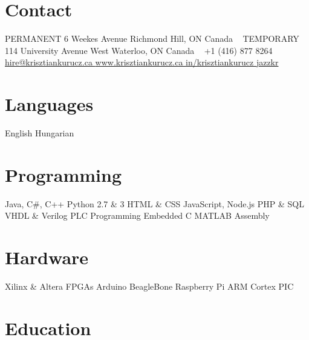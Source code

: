 \documentclass[hidelinks]{kkurucz-cv}
\begin{document}


\begin{aside} %
\section{Contact}
{\headingfont PERMANENT}
6 Weekes Avenue
Richmond Hill, ON
Canada
~
{\headingfont TEMPORARY}
114 University Avenue West
Waterloo, ON
Canada
~
{+1 (416) 877 8264\hspace{1.5mm}\mobile}
~
\href{mailto:hire@krisztiankurucz.ca}{hire@krisztiankurucz.ca }\mail
\href{http://www.krisztiankurucz.ca}{www.krisztiankurucz.ca }\website
\href{http://ca.linkedin.com/in/krisztiankurucz}{in/krisztiankurucz }\linkedin
\href{http://www.github.com/jazzkr}{jazzkr }\github
\section{Languages}
English
Hungarian
\section{Programming}
Java, C\#, C++
Python 2.7 \& 3
HTML \& CSS
JavaScript, Node.js
PHP \& SQL
VHDL \& Verilog
PLC Programming
Embedded C
MATLAB
Assembly
\section{Hardware}
Xilinx \& Altera FPGAs
Arduino
BeagleBone
Raspberry Pi
ARM Cortex
PIC
\end{aside}


\vspace{-2mm}
\section{Education}
\end{document}
